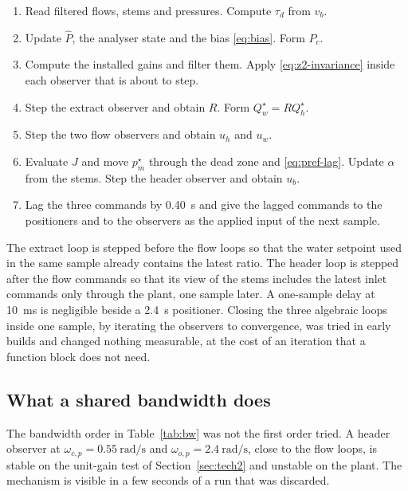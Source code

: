 \begin{enumerate}
\item Read filtered flows, stems and pressures. Compute $\tau_d$ from $v_b$.
\item Update $\hat{P}$, the analyser state and the bias \eqref{eq:bias}. Form $P_c$.
\item Compute the installed gains and filter them. Apply \eqref{eq:z2-invariance} inside each observer that is about to step.
\item Step the extract observer and obtain $R$. Form $Q_w^\star = R Q_h^\star$.
\item Step the two flow observers and obtain $u_h$ and $u_w$.
\item Evaluate $J$ and move $p_m^\star$ through the dead zone and \eqref{eq:pref-lag}. Update $\alpha$ from the stems. Step the header observer and obtain $u_b$.
\item Lag the three commands by \SI{0.40}{s} and give the lagged commands to the positioners and to the observers as the applied input of the next sample.
\end{enumerate}

The extract loop is stepped before the flow loops so that the water setpoint used in the same sample already contains the latest ratio. The header loop is stepped after the flow commands so that its view of the stems includes the latest inlet commands only through the plant, one sample later. A one-sample delay at \SI{10}{ms} is negligible beside a \SI{2.4}{s} positioner. Closing the three algebraic loops inside one sample, by iterating the observers to convergence, was tried in early builds and changed nothing measurable, at the cost of an iteration that a function block does not need.

\subsection{What a shared bandwidth does}

The bandwidth order in Table~\ref{tab:bw} was not the first order tried. A header observer at $\omega_{c,p}=0.55\ \si{\radian\per\second}$ and $\omega_{o,p}=2.4\ \si{\radian\per\second}$, close to the flow loops, is stable on the unit-gain test of Section~\ref{sec:tech2} and unstable on the plant. The mechanism is visible in a few seconds of a run that was discarded.

